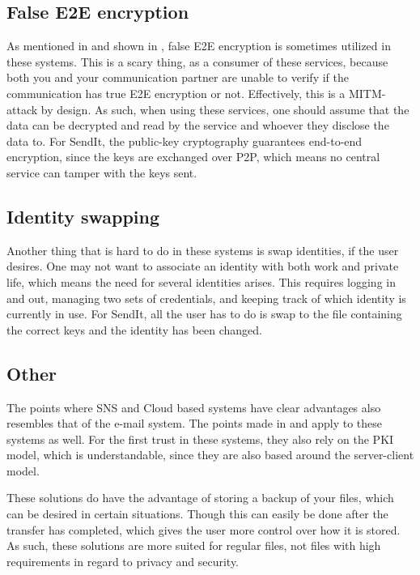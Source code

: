   \subsection{False E2E encryption}
  As mentioned in  and shown in , false E2E encryption is sometimes utilized in these systems. This is a scary thing, as a consumer of these services, because both you and your communication partner are unable to verify if the communication has true E2E encryption or not. Effectively, this is a MITM-attack by design. As such, when using these services, one should assume that the data can be decrypted and read by the service and whoever they disclose the data to. For SendIt, the public-key cryptography guarantees end-to-end encryption, since the keys are exchanged over P2P, which means no central service can tamper with the keys sent. 
%
  \subsection{Identity swapping}
  Another thing that is hard to do in these systems is swap identities, if the user desires. One may not want to associate an identity with both work and private life, which means the need for several identities arises. This requires logging in and out, managing two sets of credentials, and keeping track of which identity is currently in use. For SendIt, all the user has to do is swap to the file containing the correct keys and the identity has been changed.
%
  \subsection{Other}
  The points where SNS and Cloud based systems have clear advantages also resembles that of the e-mail system. The points made in  and  apply to these systems as well. For the first trust in these systems, they also rely on the PKI model, which is understandable, since they are also based around the server-client model.

  These solutions do have the advantage of storing a backup of your files, which can be desired in certain situations. Though this can easily be done after the transfer has completed, which gives the user more control over how it is stored. As such, these solutions are more suited for regular files, not files with high requirements in regard to privacy and security.
